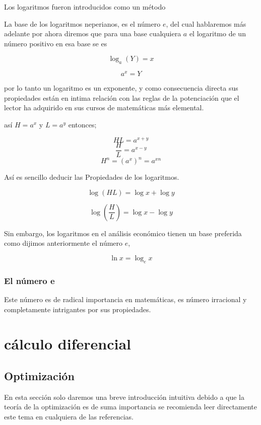 \documentclass[12pt]{article}
\begin{document}
{Los logaritmos fueron introducidos como un método 




La base de los logaritmos neperianos, es el número $e$, del cual hablaremos más adelante por ahora diremos que para una base cualquiera $a$ el logaritmo  de un número positivo en esa base se es


$$\log_{a}(Y)=x$$

$$a^{x}=Y$$

por lo tanto un logaritmo es un exponente, y como consecuencia directa  sus propiedades están en intima relación con las reglas de la potenciación que el lector ha adquirido en sus cursos de matemáticas más elemental. 

así $H=a^{x}$ y $L=a^{y}$ entonces;

$$HL= a^{x+y}$$
$$\dfrac{H}{L}= a^{x-y}$$
$$ H^{n}= (a^{x})^{n}= a^{xn}$$





Así es sencillo deducir las Propiedades de los logaritmos.



$$\log(HL)= \log x + \log y$$ 




$$ \log(\dfrac{H}{L})= \log x - \log y$$

Sin embargo, los logaritmos en el análisis económico tienen un base preferida como dijimos anteriormente el número $e$, 

$$ \ln x = \log_{e}x$$

\subsubsection{El número e}

Este número es de radical importancia en matemáticas, es número irracional  y completamente intrigantes por sus propiedades.
 



\section{cálculo diferencial}




 

\subsection*{Optimización}

En esta sección solo daremos una breve introducción intuitiva debido a que la teoría de la optimización es de suma importancia se recomienda leer directamente este tema en cualquiera de las referencias.


}
\end{document}
